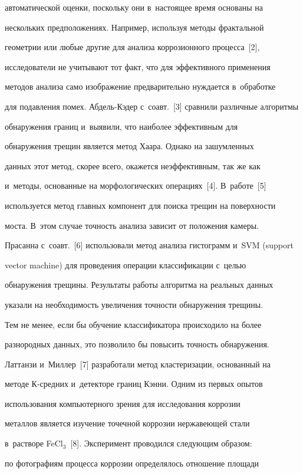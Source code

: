 автоматической оценки, поскольку они в~настоящее время основаны на 


нескольких предположениях. Например, используя методы фрактальной 


геометрии или любые другие для анализа коррозионного процесса~[2], 


исследователи не учитывают тот факт, что для эффективного применения 


методов анализа само изображение предварительно нуждается в~обработке 


для подавления помех. Абдель-Кэ\-дер с~соавт.~[3] сравнили различные алгоритмы 


обнаружения границ и~выявили, что наиболее эффективным для 


обнаружения трещин является метод Хаара. Однако на зашумленных 


данных этот метод, скорее всего, окажется неэффективным, так же как 


и~методы, основанные на морфологических операциях~[4]. В~работе~[5] 


используется метод главных компонент для поиска трещин на поверхности 


моста. В~этом случае точность анализа зависит от положения камеры. 


Прасанна с~соавт.~[6] использовали метод анализа гистограмм и~SVM (support 


vector machine) для проведения операции классификации с~целью 


обнаружения трещины. Результаты работы алгоритма на реальных данных 


указали на необходимость увеличения точности обнаружения трещины. 


Тем не менее, если бы обучение классификатора происходило на более 


разнородных данных, это позволило бы повысить точность обнаружения. 


Латтанзи и~Миллер~[7] разработали метод кластеризации, основанный на 


методе К-средних и~детекторе границ Кэнни. Одним из первых опытов 


использования компьютерного зрения для исследования коррозии 


металлов является изучение точечной коррозии нержавеющей стали 


в~растворе FeCl$_3$~[8]. Эксперимент проводился следующим образом: 


по фотографиям процесса коррозии определялось отношение площади 


